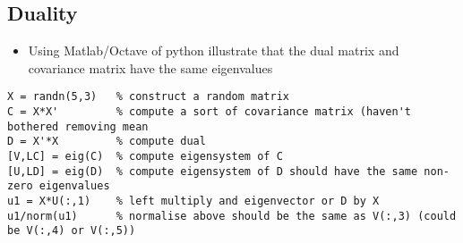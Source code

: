 \documentclass[11pt]{article}
\begin{document}
\subsection{Duality}
\label{sec:org18bbe71}
\begin{itemize}
\item Using Matlab/Octave of python illustrate that the dual matrix and
covariance matrix have the same eigenvalues
\end{itemize}
\begin{verbatim}
X = randn(5,3)   % construct a random matrix
C = X*X'         % compute a sort of covariance matrix (haven't bothered removing mean
D = X'*X         % compute dual
[V,LC] = eig(C)  % compute eigensystem of C
[U,LD] = eig(D)  % compute eigensystem of D should have the same non-zero eigenvalues
u1 = X*U(:,1)    % left multiply and eigenvector or D by X
u1/norm(u1)      % normalise above should be the same as V(:,3) (could be V(:,4) or V(:,5))
\end{verbatim}
\end{document}
